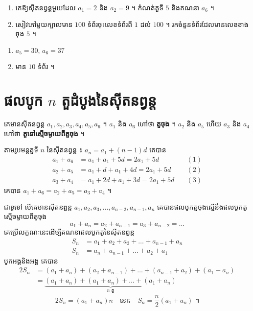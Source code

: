 \begin{pro}
\begin{enumerate}[a]
  \item គេឱ្យស៊ីតនព្វន្តមួយដែល $a_1 = 2$ និង $a_2 = 9$ ។ កំណត់តួទី $5$ និងគណនា $a_6$ ។
  \item សៀវភៅមួយក្បាលមាន $100$ ទំព័រចុះលេខទំព័រពី $1$ ដល់ $100$ ។ រកចំនួនទំព័រដែលមានលេខខាងចុង $5$ ។
\end{enumerate}
\ans
\begin{enumerate}[a]
  \item $a_5 = 30$, $a_6 = 37$
  \item មាន $10$ ទំព័រ ។
\end{enumerate}
\end{pro}

\section{ផលបូក \texorpdfstring{$n$}{n} តួដំបូងនៃស៊ីតនព្វន្ត}

គេមានស៊ីតនព្វន្ត $a_1, a_2, a_3, a_4, a_5, a_6$ ។ $a_1$ និង $a_6$ ហៅថា \textbf{តួចុង} ។ $a_2$ និង $a_5$ ហើយ $a_3$ និង $a_4$ ហៅថា \textbf{តួនៅស្មើចម្ងាយពីតួចុង} ។

តាមរូបមន្តតួទី $n$ នៃស៊ីតនព្វន្ត ៖ $a_n = a_1 + (n - 1)d$ គេបាន
\[
\begin{aligned}
a_1 + a_6 &= a_1 + a_1 + 5d = 2a_1 + 5d &\quad (1)\\
a_2 + a_5 &= a_1 + d + a_1 + 4d = 2a_1 + 5d &\quad (2)\\
a_3 + a_4 &= a_1 + 2d + a_1 + 3d = 2a_1 + 5d &\quad (3)
\end{aligned}
\]
គេបាន $a_1 + a_6 = a_2 + a_5 = a_3 + a_4$ ។

ជាទូទៅ បើគេមានស៊ីតនព្វន្ត $a_1, a_2, a_3, \ldots, a_{n-2}, a_{n-1}, a_n$ គេបានផលបូកតួចុងស្មើនឹងផលបូកតួស្មើចម្ងាយពីតួចុង
\[
a_1 + a_n = a_2 + a_{n-1} = a_3 + a_{n-2} = \ldots
\]
គេប្រើលក្ខណៈនេះដើម្បីគណនាផលបូកតួនៃស៊ីតនព្វន្ត
\[
\begin{aligned}
S_n &= a_1 + a_2 + a_3 + \ldots + a_{n-1} + a_n\\
S_n &= a_n + a_{n-1} + \ldots + a_2 + a_1
\end{aligned}
\]
បូកអង្គនិងអង្គ គេបាន
\[
\begin{aligned}
2S_n &= (a_1 + a_n) + (a_2 + a_{n-1}) + \ldots + (a_{n-1} + a_2) + (a_1 + a_n)\\
&= \underbrace{(a_1 + a_n) + (a_1 + a_n) + \ldots + (a_1 + a_n)}_{n \text{ តួ}}
\end{aligned}
\]
\[
2S_n = (a_1 + a_n)n \quad \text{នោះ} \quad S_n = \frac{n}{2}(a_1 + a_n) \text{ ។}
\]

